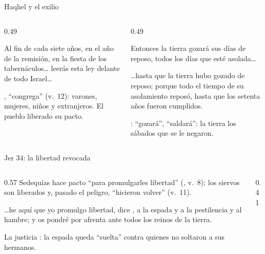 \begin{frame}{Haqhel y el exilio}
\begin{columns}[t,onlytextwidth]
\begin{column}{0.49\textwidth}
\begin{cita}Al fin de cada siete años, en el año de la remisión, en la fiesta de los tabernáculos\ldots{} leerás esta ley delante de todo Israel\ldots{}\end{cita}
\scriptsize {}, ``congrega'' (v.~12): varones, mujeres, niños y extranjeros. El pueblo liberado  su pacto.
\end{column}
\begin{column}{0.49\textwidth}
\begin{cita}Entonces la tierra gozará sus días de reposo, todos los días que esté asolada\ldots{}\end{cita}
\begin{cita}\ldots{}hasta que la tierra hubo gozado de reposo; porque todo el tiempo de su asolamiento reposó, hasta que los setenta años fueron cumplidos.\end{cita}
\scriptsize {}: ``gozará'', ``saldará'': la tierra  los sábados que se le negaron.
\end{column}
\end{columns}
\end{frame}

\begin{frame}{Jer 34: la libertad revocada}
\begin{columns}[c,onlytextwidth]
\begin{column}{0.57\textwidth}
\scriptsize Sedequías hace pacto ``para promulgarles libertad'' (, v.~8); los siervos son liberados y, pasado el peligro, ``hicieron volver'' (v.~11).
\begin{cita}\ldots{}he aquí que yo promulgo libertad, dice \SENOR, a la espada y a la pestilencia y al hambre; y os pondré por afrenta ante todos los reinos de la tierra.\end{cita}
\scriptsize La justicia : la espada queda ``suelta'' contra quienes no soltaron a sus hermanos.
\end{column}
\begin{column}{0.41\textwidth}\end{column}
\end{columns}
\end{frame}

